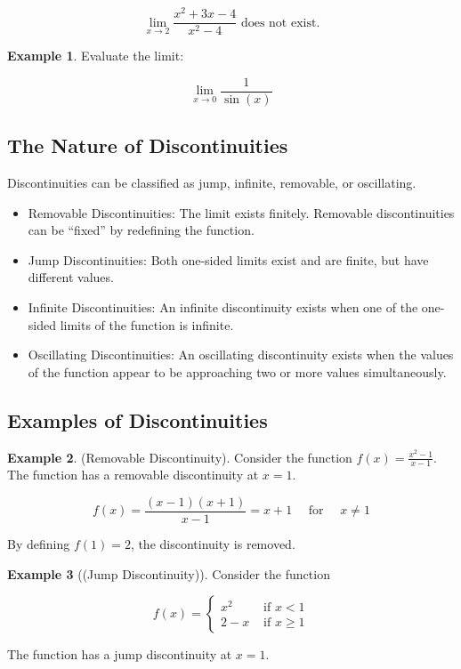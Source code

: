 \documentclass[
]{book}
\providecommand{\tightlist}{%
  \setlength{\itemsep}{0pt}\setlength{\parskip}{0pt}}
\theoremstyle{definition}
\theoremstyle{definition}
\newtheorem{example}{Example}[chapter]
\theoremstyle{definition}
\theoremstyle{definition}
\theoremstyle{remark}
\begin{document}
\[
\lim _{x \rightarrow 2} \frac{x^{2}+3 x-4}{x^{2}-4} \text { does not exist.}
\]

\begin{example}
\protect\hypertarget{exm:unnamed-chunk-36}{}\label{exm:unnamed-chunk-36}Evaluate the limit:

\[
\lim _{x \rightarrow 0} \frac{1}{\sin (x)}
\]
\end{example}

\subsection{The Nature of Discontinuities}\label{the-nature-of-discontinuities}

Discontinuities can be classified as jump, infinite, removable, or oscillating.

\begin{itemize}
\tightlist
\item
  Removable Discontinuities: The limit exists finitely. Removable discontinuities can be ``fixed'' by redefining the function.
\item
  Jump Discontinuities: Both one-sided limits exist and are finite, but have different values.
\item
  Infinite Discontinuities: An infinite discontinuity exists when one of the one-sided limits of the function is infinite.
\item
  Oscillating Discontinuities: An oscillating discontinuity exists when the values of the function appear to be approaching two or more values simultaneously.
\end{itemize}

\subsection{Examples of Discontinuities}\label{examples-of-discontinuities}

\begin{example}
\protect\hypertarget{exm:unnamed-chunk-37}{}\label{exm:unnamed-chunk-37}(Removable Discontinuity). Consider the function \(f(x)=\frac{x^{2}-1}{x-1}\). The function has a removable discontinuity at \(x=1\).

\[
f(x)=\frac{(x-1)(x+1)}{x-1}=x+1 \quad \text { for } \quad x \neq 1
\]

By defining \(f(1)=2\), the discontinuity is removed.
\end{example}

\begin{example}[(Jump Discontinuity)]
\protect\hypertarget{exm:unnamed-chunk-38}{}\label{exm:unnamed-chunk-38}Consider the function

\[
f(x)= \begin{cases}x^{2} & \text { if } x<1 \\ 2-x & \text { if } x \geq 1\end{cases}
\]

The function has a jump discontinuity at \(x=1\).
\end{example}
\end{document}
